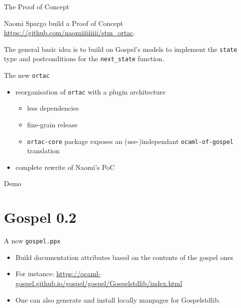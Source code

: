 \documentclass[pdf]{beamer}
\begin{document}
\begin{frame}{The Proof of Concept}

  Naomi Spargo build a Proof of Concept \url{https://github.com/naomiiiiiiiii/stm_ortac}.

  The general basic idea is to build on Gospel's models to implement the
  \texttt{state} type and postconditions for the \texttt{next\_state} function.

\end{frame}

\begin{frame}{The new \texttt{ortac}}

  \begin{itemize}
    \item reorganisation of \texttt{ortac} with a plugin architecture
      \begin{itemize}
        \item less dependencies
        \item fine-grain release
        \item \texttt{ortac-core} package exposes an (use-)independant
          \texttt{ocaml-of-gospel} translation
      \end{itemize}
    \item complete rewrite of Naomi's PoC
  \end{itemize}

\end{frame}

\begin{frame}
  \centering
  \huge{Demo}
\end{frame}

\section{Gospel 0.2}

\begin{frame}{A new \texttt{gospel.ppx}}

  \begin{itemize}
    \item Build documentation attributes based on the contents of the gospel ones
    \item For instance: \url{https://ocaml-gospel.github.io/gospel/gospel/Gospelstdlib/index.html}
    \item One can also generate and install locally manpages for Gospelstdlib.
  \end{itemize}

\end{frame}
\end{document}
